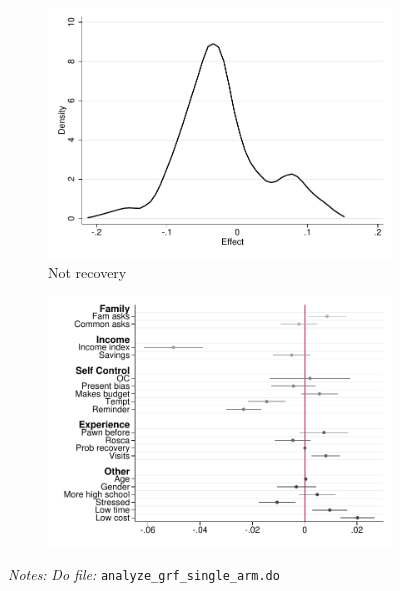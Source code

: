 \documentclass[11pt]{article}
\begin{document}
\begin{figure}[H]
\begin{center}
    \begin{subfigure}{0.4\textwidth}
        \caption{Not recovery}
        \centering
        \includegraphics[width=\textwidth]{Figuras/he_dist_def_c_pro_5.pdf}
    \end{subfigure}
    \begin{subfigure}{0.4\textwidth}
        \caption*{}
        \centering
        \includegraphics[width=\textwidth]{Figuras/HE/he_int_vertical_def_c_pro_5.pdf}
    \end{subfigure}
    \end{center}
     \footnotesize \textit{Notes: } 
      \footnotesize{ \textit{Do file: }  \texttt{analyze\_grf\_single\_arm.do}}
\end{figure}
\end{document}
